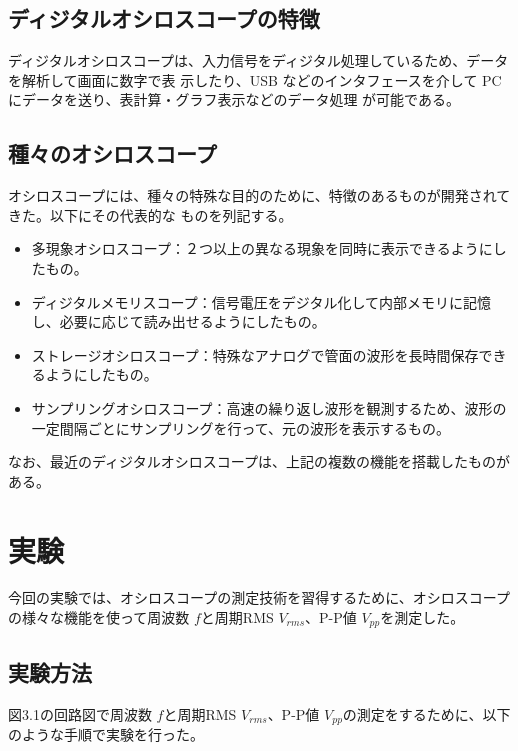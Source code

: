 \documentclass[12pt,a4paper]{jsarticle}
\numberwithin{equation}{section}
\numberwithin{figure}{section}
\numberwithin{table}{section}
\begin{document}
\newpage
\subsection{ディジタルオシロスコープの特徴}
ディジタルオシロスコープは、入力信号をディジタル処理しているため、データを解析して画面に数字で表
示したり、USB などのインタフェースを介して PC にデータを送り、表計算・グラフ表示などのデータ処理
が可能である。

\subsection{種々のオシロスコープ}
オシロスコープには、種々の特殊な目的のために、特徴のあるものが開発されてきた。以下にその代表的な
ものを列記する。
\begin{itemize}
	\item 多現象オシロスコープ：２つ以上の異なる現象を同時に表示できるようにしたもの。
	\item ディジタルメモリスコープ：信号電圧をデジタル化して内部メモリに記憶し、必要に応じて読み出せるようにしたもの。
	\item ストレージオシロスコープ：特殊なアナログで管面の波形を長時間保存できるようにしたもの。
	\item サンプリングオシロスコープ：高速の繰り返し波形を観測するため、波形の一定間隔ごとにサンプリングを行って、元の波形を表示するもの。
\end{itemize}
なお、最近のディジタルオシロスコープは、上記の複数の機能を搭載したものがある。

\newpage
\section{実験}
今回の実験では、オシロスコープの測定技術を習得するために、オシロスコープの様々な機能を使って周波数 $f$と周期RMS $V_{rms}$、P-P値 $V_{pp}$を測定した。
\subsection{実験方法}
図3.1の回路図で周波数 $f$と周期RMS $V_{rms}$、P-P値 $V_{pp}$の測定をするために、以下のような手順で実験を行った。
\end{document}
